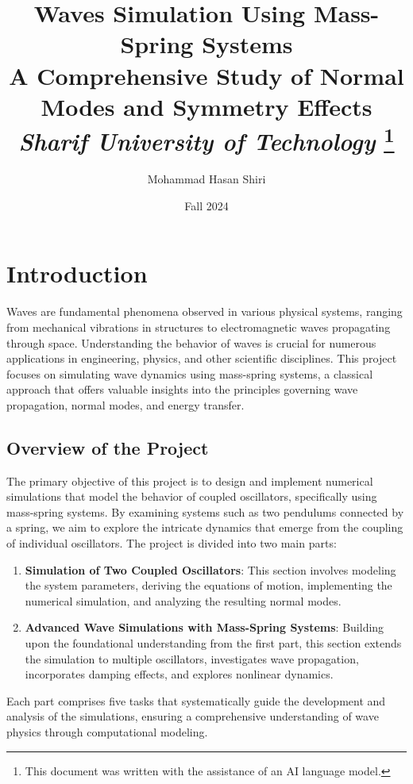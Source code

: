 \documentclass[12pt]{report} %
\title{%
    \textbf{Waves Simulation Using Mass-Spring Systems} \\[0.5cm]
    \large A Comprehensive Study of Normal Modes and Symmetry Effects \\
    \vspace{0.5cm}
    \large \textit{Sharif University of Technology} %
    \thanks{This document was written with the assistance of an AI language model.}
}
\author{Mohammad Hasan Shiri}
\date{Fall 2024}
\begin{document}
\maketitle
\tableofcontents

\chapter{Introduction}
\label{chap:introduction}

Waves are fundamental phenomena observed in various physical systems, ranging from mechanical vibrations in structures to electromagnetic waves propagating through space. Understanding the behavior of waves is crucial for numerous applications in engineering, physics, and other scientific disciplines. This project focuses on simulating wave dynamics using mass-spring systems, a classical approach that offers valuable insights into the principles governing wave propagation, normal modes, and energy transfer.

\section{Overview of the Project}

The primary objective of this project is to design and implement numerical simulations that model the behavior of coupled oscillators, specifically using mass-spring systems. By examining systems such as two pendulums connected by a spring, we aim to explore the intricate dynamics that emerge from the coupling of individual oscillators. The project is divided into two main parts:

\begin{enumerate}
    \item \textbf{Simulation of Two Coupled Oscillators}: This section involves modeling the system parameters, deriving the equations of motion, implementing the numerical simulation, and analyzing the resulting normal modes.
    \item \textbf{Advanced Wave Simulations with Mass-Spring Systems}: Building upon the foundational understanding from the first part, this section extends the simulation to multiple oscillators, investigates wave propagation, incorporates damping effects, and explores nonlinear dynamics.
\end{enumerate}

Each part comprises five tasks that systematically guide the development and analysis of the simulations, ensuring a comprehensive understanding of wave physics through computational modeling.
\end{document}

